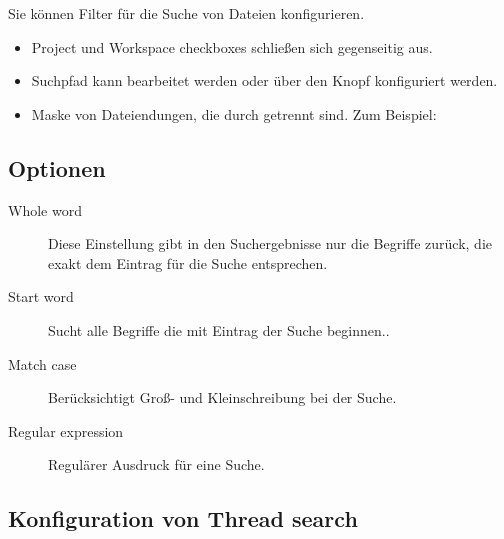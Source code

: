 
Sie können Filter für die Suche von Dateien konfigurieren.

\begin{itemize}
\item Project und Workspace checkboxes schließen sich gegenseitig aus.
\item Suchpfad kann bearbeitet werden oder über den Knopf  konfiguriert werden.
\item Maske von Dateiendungen, die durch \samp{;} getrennt sind. Zum Beispiel: 
\end{itemize}

\subsection{Optionen}

\begin{description}
\item[Whole word] Diese Einstellung gibt in den Suchergebnisse nur die Begriffe zurück, die exakt dem Eintrag für die Suche entsprechen.
\item[Start word] Sucht alle Begriffe die mit Eintrag der Suche beginnen..
\item[Match case] Berücksichtigt Groß- und Kleinschreibung bei der Suche.
\item[Regular expression] Regulärer Ausdruck für eine Suche.
\end{description}


\subsection{Konfiguration von Thread search}

